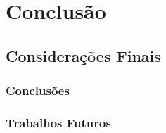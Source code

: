 \part{Conclusão}

\chapter[Considerações Finais]{Considerações Finais}

\section{Conclusões}

\section{Trabalhos Futuros}

